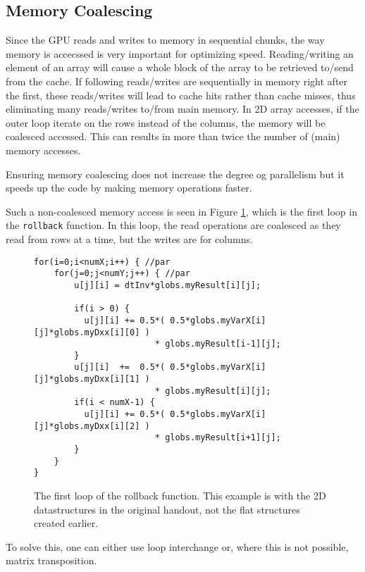 \subsection{Memory Coalescing}
Since the GPU reads and writes to memory in sequential chunks, the way memory is accecssed
is very important for optimizing speed. Reading/writing an element of an array will cause a whole block of the array to be retrieved to/send from the cache. If following reads/writes are sequentially in memory right after the first, these reads/writes will lead to cache hits rather than cache misses, thus eliminating many reads/writes to/from main memory. In 2D array accesses, if the outer loop iterate on the rows instead of the columns, the memory will be coalesced accessed. This can results in more than twice the number of (main) memory accesses.

Ensuring memory coalescing does not increase the degree og parallelism but it speeds up the code by making memory operations faster.

Such a non-coalesced memory access is seen in Figure \ref{code:coal1}, which is the first
loop in the \texttt{rollback} function. In this loop, the read operations are
coalesced as they read from rows at a time, but the writes are for columns.

\begin{figure}[H]
    \begin{lstlisting}
for(i=0;i<numX;i++) { //par
    for(j=0;j<numY;j++) { //par
        u[j][i] = dtInv*globs.myResult[i][j];

        if(i > 0) {
          u[j][i] += 0.5*( 0.5*globs.myVarX[i][j]*globs.myDxx[i][0] )
                        * globs.myResult[i-1][j];
        }
        u[j][i]  +=  0.5*( 0.5*globs.myVarX[i][j]*globs.myDxx[i][1] )
                        * globs.myResult[i][j];
        if(i < numX-1) {
          u[j][i] += 0.5*( 0.5*globs.myVarX[i][j]*globs.myDxx[i][2] )
                        * globs.myResult[i+1][j];
        }
    }
}
    \end{lstlisting}
    \caption{The first loop of the rollback function. This example is with the
    2D datastructures in the original handout, not the flat structures created
    earlier.}
    \label{code:coal1}
\end{figure}

To solve this, one can either use loop interchange or, where this is not possible, matrix transposition.

